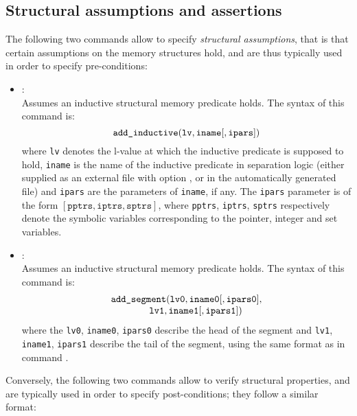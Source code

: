 \subsection{Structural assumptions and assertions}
The following two commands allow to specify {\em structural assumptions},
that is that certain assumptions on the memory structures hold, and are
thus typically used in order to specify pre-conditions:
\begin{itemize}
\item[\dcommand{add\_inductive}]: \\
  Assumes an inductive structural memory predicate holds.
  The syntax of this command is:
  \[
  \texttt{add\_inductive}( \texttt{lv}, \texttt{iname} [, \texttt{ipars}] )
  \]
  where \texttt{lv} denotes the l-value at which the inductive predicate
  is supposed to hold, \texttt{iname} is the name of the inductive
  predicate in separation logic (either supplied as an external file
  with option , or in the automatically generated
  file) and \texttt{ipars} are the parameters of \texttt{iname}, if
  any.
  The \texttt{ipars} parameter is of the form \( [ \texttt{pptrs},
  \texttt{iptrs}, \texttt{sptrs} ] \), where \texttt{pptrs},
  \texttt{iptrs}, \texttt{sptrs} respectively denote the symbolic
  variables corresponding to the pointer, integer and set variables.
\item[\dcommand{add\_segment}]: \\
  Assumes an inductive structural memory predicate holds.
  The syntax of this command is:
  \[
  \begin{array}{l}
    \texttt{add\_segment}( \texttt{lv0}, \texttt{iname0}
    [, \texttt{ipars0}], \\
    \qquad \qquad \texttt{lv1}, \texttt{iname1} [, \texttt{ipars1}] )
  \end{array}
  \]
  where the \texttt{lv0}, \texttt{iname0}, \texttt{ipars0} describe the
  head of the segment and \texttt{lv1}, \texttt{iname1}, \texttt{ipars1}
  describe the tail of the segment, using the same format as in command
  .
\end{itemize}
Conversely, the following two commands allow to verify structural
properties, and are typically used in order to specify post-conditions;
they follow a similar format:
